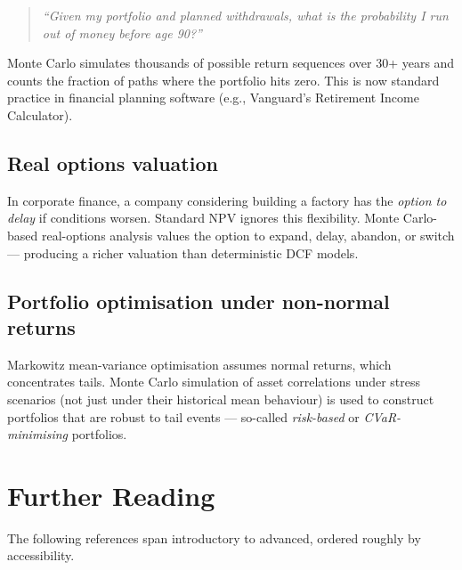 \documentclass[11pt, a4paper]{article}
\begin{document}
\begin{quote}
\emph{``Given my portfolio and planned withdrawals, what is the probability I run out of money before age 90?''}
\end{quote}
Monte Carlo simulates thousands of possible return sequences over 30+ years and counts the fraction of paths where the portfolio hits zero. This is now standard practice in financial planning software (e.g., Vanguard's Retirement Income Calculator).

\subsection*{Real options valuation}

In corporate finance, a company considering building a factory has the \emph{option to delay} if conditions worsen. Standard NPV ignores this flexibility. Monte Carlo-based real-options analysis values the option to expand, delay, abandon, or switch — producing a richer valuation than deterministic DCF models.

\subsection*{Portfolio optimisation under non-normal returns}

Markowitz mean-variance optimisation assumes normal returns, which concentrates tails. Monte Carlo simulation of asset correlations under stress scenarios (not just under their historical mean behaviour) is used to construct portfolios that are robust to tail events — so-called \emph{risk-based} or \emph{CVaR-minimising} portfolios.

\section{Further Reading}
\label{sec:reading}

The following references span introductory to advanced, ordered roughly by accessibility.
\end{document}
